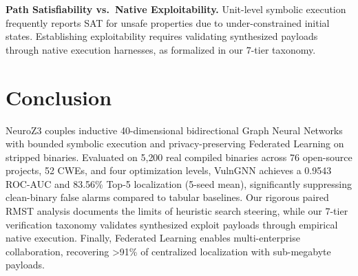 \documentclass[10pt,conference]{IEEEtran}
\begin{document}
\textbf{Path Satisfiability vs.\ Native Exploitability.} Unit-level symbolic execution frequently reports SAT for unsafe properties
due to under-constrained initial states. Establishing exploitability requires validating synthesized payloads through native execution
harnesses, as formalized in our 7-tier taxonomy.

\section{Conclusion}

NeuroZ3 couples inductive 40-dimensional bidirectional Graph Neural Networks with bounded symbolic execution and privacy-preserving
Federated Learning on stripped binaries. Evaluated on 5{,}200 real compiled binaries across 76 open-source projects, 52 CWEs, and
four optimization levels, VulnGNN achieves a 0.9543 ROC-AUC and 83.56\% Top-5 localization (5-seed mean), significantly suppressing clean-binary
false alarms compared to tabular baselines. Our rigorous paired RMST analysis documents the limits of heuristic search steering,
while our 7-tier verification taxonomy validates synthesized exploit payloads through empirical native execution. Finally,
Federated Learning enables multi-enterprise collaboration, recovering >91\% of centralized localization with sub-megabyte payloads.
\end{document}
